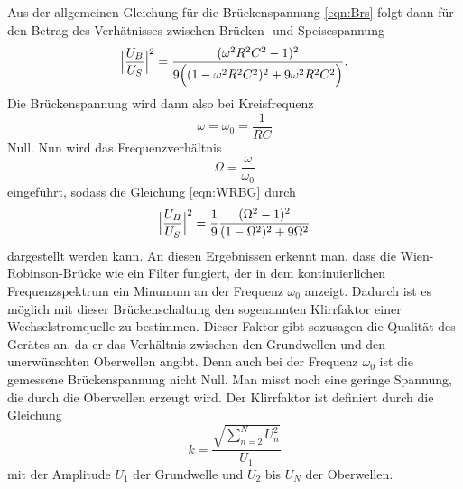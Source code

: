 Aus der allgemeinen Gleichung für die Brückenspannung \eqref{eqn:Brs}
folgt dann für den Betrag des Verhätnisses zwischen Brücken- und Speisespannung
\begin{equation}
  \Bigl|\frac{U_B}{U_S}\Bigr|^2 = \frac{(\omega^2 R^2 C^2 -1)^2}{9\Bigl
  ((1-\omega^2 R^2 C^2)^2 + 9 \omega^2 R^2 C^2\Bigr)} .
  \label{eqn:WRBG}
\end{equation}
Die Brückenspannung wird dann also bei Kreisfrequenz
\begin{equation}
  \omega = \omega_0 = \frac{1}{RC}
\end{equation}
Null.
Nun wird das Frequenzverhältnis
\begin{equation}
  \Omega = \frac{\omega}{\omega_0}
\end{equation}
eingeführt, sodass die Gleichung \eqref{eqn:WRBG} durch
\begin{equation}
    \Bigl|\frac{U_B}{U_S}\Bigr|^2 = \frac{1}{9} \frac{(\Omega^2-1)^2}
    {(1-\Omega^2)^2 + 9\Omega^2}
    \label{eqn:wienrobin1/9}
\end{equation}
dargestellt werden kann.
An diesen Ergebnissen erkennt man, dass die Wien-Robinson-Brücke wie ein
Filter fungiert, der in dem kontinuierlichen Frequenzspektrum ein Minumum
an der Frequenz $\omega_0$ anzeigt. Dadurch ist es möglich mit dieser
Brückenschaltung den sogenannten Klirrfaktor einer Wechselstromquelle zu
bestimmen. Dieser Faktor gibt sozusagen die Qualität des Gerätes an, da er das
Verhältnis zwischen den Grundwellen und den unerwünschten Oberwellen angibt.
Denn auch bei der Frequenz $\omega_0$ ist die gemessene Brückenspannung nicht
Null. Man misst noch eine geringe Spannung, die durch die Oberwellen erzeugt
wird. Der Klirrfaktor ist definiert durch die Gleichung
\begin{equation}
  k = \frac{\sqrt{\sum_{n=2}^N U_n^2}}{U_1}
  \label{eqn:klirrf}
\end{equation}
mit der Amplitude $U_1$ der Grundwelle und $U_2$ bis $U_N$ der Oberwellen.
